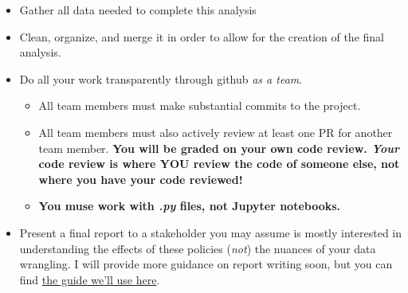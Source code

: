 \documentclass[12pt]{article}
\begin{document}
\begin{itemize}
  \item Gather all data needed to complete this analysis
  \item Clean, organize, and merge it in order to allow for the creation of the final analysis.
  \item Do all your work transparently through github \emph{as a team}.
  \begin{itemize}
    \item All team members must make substantial commits to the project.
    \item All team members must also actively review at least one PR for another team member. \textbf{You will be graded on your own code review. \emph{Your} code review is where YOU review the code of someone else, not where you have your code reviewed!}
    \item \textbf{You muse work with \emph{.py} files, not Jupyter notebooks.}
  \end{itemize}
  \item Present a final report to a stakeholder you may assume is mostly interested in understanding the effects of these policies (\emph{not}) the nuances of your data wrangling. I will provide more guidance on report writing soon, but you can find \href{https://ds4humans.com/40_in_practice/25_writing_to_stakeholders.html}{the guide we'll use here}.
\end{itemize}
\end{document}
